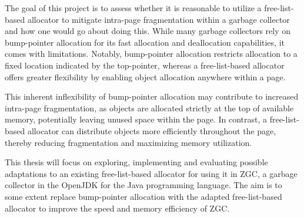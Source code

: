 
The goal of this project is to assess whether it is reasonable to utilize a free-list-based allocator to mitigate intra-page fragmentation within a garbage collector and how one would go about doing this. While many garbage collectors rely on bump-pointer allocation for its fast allocation and deallocation capabilities, it comes with limitations. Notably, bump-pointer allocation restricts allocation to a fixed location indicated by the top-pointer, whereas a free-list-based allocator offers greater flexibility by enabling object allocation anywhere within a page.

This inherent inflexibility of bump-pointer allocation may contribute to increased intra-page fragmentation, as objects are allocated strictly at the top of available memory, potentially leaving unused space within the page. In contrast, a free-list-based allocator can distribute objects more efficiently throughout the page, thereby reducing fragmentation and maximizing memory utilization.

This thesis will focus on exploring, implementing and evaluating possible adaptations to an existing free-list-based allocator for using it in ZGC, a garbage collector in the OpenJDK for the Java programming language. The aim is to some extent replace bump-pointer allocation with the adapted free-list-based allocator to improve the speed and memory efficiency of ZGC.

